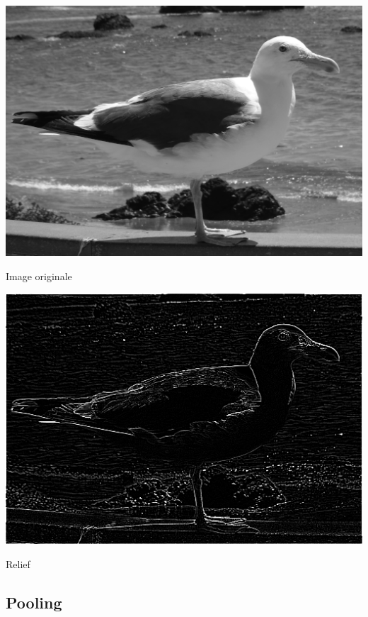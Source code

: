 \documentclass[11pt,class=report,crop=false]{standalone}
\begin{document}
\begin{center}
	\begin{minipage}{0.45\textwidth}\center
       \includegraphics[scale=\myscale,scale=0.4]{figures/image_relief_avant}
	
	Image originale
	\end{minipage}
	\begin{minipage}{0.45\textwidth}\center
	 \includegraphics[scale=\myscale,scale=0.4]{figures/image_relief_apres}
	
	Relief
    \end{minipage}	
\end{center}


\subsection{Pooling}
\end{document}
